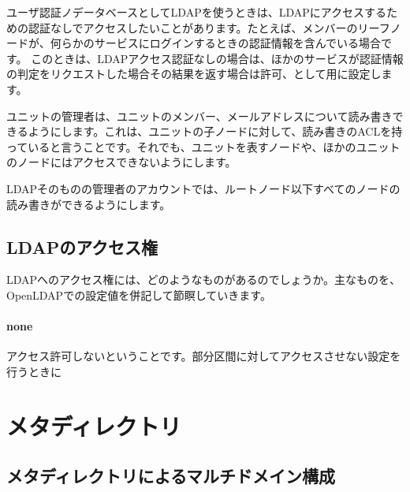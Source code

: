 ユーザ認証ノデータベースとしてLDAPを使うときは、LDAPにアクセスするための認証なしでアクセスしたいことがあります。たとえば、メンバーのリーフノードが、何らかのサービスにログインするときの認証情報を含んでいる場合です。
このときは、LDAPアクセス認証なしの場合は、ほかのサービスが認証情報の判定をリクエストした場合その結果を返す場合は許可、として用に設定します。

ユニットの管理者は、ユニットのメンバー、メールアドレスについて読み書きできるようにします。これは、ユニットの子ノードに対して、読み書きのACLを持っていると言うことです。それでも、ユニットを表すノードや、ほかのユニットのノードにはアクセスできないようにします。

LDAPそのものの管理者のアカウントでは、ルートノード以下すべてのノードの読み書きができるようにします。

\subsection{LDAPのアクセス権}

LDAPへのアクセス権には、どのようなものがあるのでしょうか。主なものを、OpenLDAPでの設定値を併記して節瞑していきます。

\paragraph{none}
アクセス許可しないということです。部分区間に対してアクセスさせない設定を行うときに

\section{メタディレクトリ}

\subsection{メタディレクトリによるマルチドメイン構成}